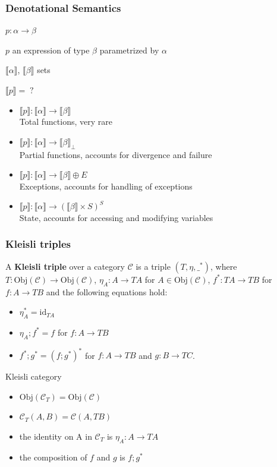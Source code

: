 \documentclass{beamer}
\newcommand{\sem}[1]{\llbracket #1 \rrbracket}
\newcommand{\obj}[1]{\text{Obj}(#1)}
\newcommand{\id}[1]{\text{id}_{#1}}
\begin{document}
\begin{frame}
  \frametitle{Denotational Semantics}

  $p : \alpha \to \beta$

  $p$ an expression of type $\beta$ parametrized by $\alpha$

  \vfill

  $\sem{\alpha}$, $\sem{\beta}$ sets

  \vfill

  $\sem{p} =\; ?$
  \begin{itemize}
  \pause
  \item $\sem{p} : \sem{\alpha} \to \sem{\beta}$ \\
    Total functions, very rare
  \pause
  \item $\sem{p} : \sem{\alpha} \to \sem{\beta}_\bot$ \\
    Partial functions, accounts for divergence and failure
  \pause
  \item $\sem{p} : \sem{\alpha} \to \sem{\beta} \oplus E$ \\
    Exceptions, accounts for handling of exceptions
  \pause
  \item $\sem{p} : \sem{\alpha} \to (\sem{\beta} \times S)^S$ \\
    State, accounts for accessing and modifying variables
  \end{itemize}
\end{frame}

\begin{frame}
  \frametitle{Kleisli triples}

  A \textbf{Kleisli triple} over a category $\mathcal{C}$ is a triple $(T, \eta,
  \_^{*})$, where $T : \obj{\mathcal{C}} \to \obj{\mathcal{C}}$, $\eta_A : A
  \to T A$ for $A \in \obj{\mathcal{C}}$, $f^* : T A \to T B$ for $f : A \to T
  B$ and the following equations hold:

  \begin{itemize}
  \item $\eta_A^* = \id{T A}$
  \item $\eta_A; f^* = f$ for $f : A \to T B$
  \item $f^*; g^* = (f;g^*)^*$ for $f : A \to T B$ and $g : B \to T C$.
  \end{itemize}

  \pause

  \begin{block}{Kleisli category}
    \begin{itemize}
    \item $\obj{\mathcal{C}_T} = \obj{\mathcal{C}}$
    \item $\mathcal{C}_T(A, B) = \mathcal{C}(A, T B)$
    \item the identity on A in $\mathcal{C}_T$ is $\eta_A : A \to T A$
    \item the composition of $f$ and $g$ is $f; g^*$
    \end{itemize}
  \end{block}
\end{frame}
\end{document}
